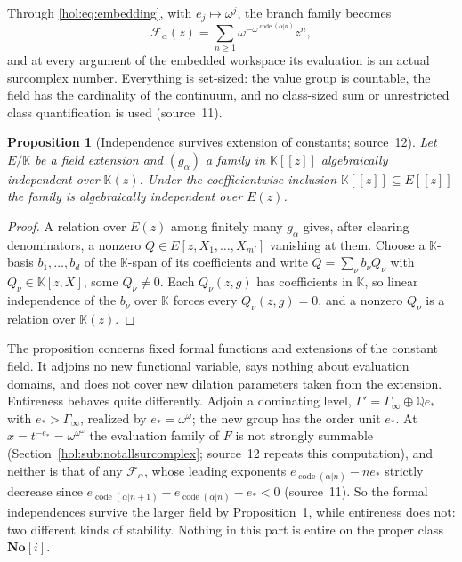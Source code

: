 \documentclass[11pt]{article}
\numberwithin{equation}{section}
\newtheorem{proposition}[theorem]{Proposition}
\theoremstyle{definition}
\theoremstyle{remark}
\newcommand{\Q}{\mathbb Q}
\newcommand{\No}{\mathbf{No}}
\newcommand{\KK}{\mathbb K}
\newcommand{\code}{\operatorname{code}}
\begin{document}
Through \eqref{hol:eq:embedding}, with $e_j\mapsto\omega^j$, the branch family
becomes
\[
 \mathcal F_\alpha(z)=\sum_{n\ge1}\omega^{-\omega^{\code(\alpha|n)}}z^n,
\]
and at every argument of the embedded workspace its evaluation is an actual
surcomplex number. Everything is set-sized: the value group is countable,
the field has the cardinality of the continuum, and no class-sized sum or
unrestricted class quantification is used (source~11).

\begin{proposition}[Independence survives extension of constants;
source~12]\label{hol:cf:prop:scalar}
Let $E/\KK$ be a field extension and $(g_\alpha)$ a family in $\KK[[z]]$
algebraically independent over $\KK(z)$. Under the coefficientwise inclusion
$\KK[[z]]\subseteq E[[z]]$ the family is algebraically independent over $E(z)$.
\end{proposition}

\begin{proof}
A relation over $E(z)$ among finitely many $g_\alpha$ gives, after clearing
denominators, a nonzero $Q\in E[z,X_1,\ldots,X_{m'}]$ vanishing at them. Choose
a $\KK$-basis $b_1,\ldots,b_d$ of the $\KK$-span of its coefficients and write
$Q=\sum_\nu b_\nu Q_\nu$ with $Q_\nu\in\KK[z,X]$, some $Q_\nu\ne0$. Each
$Q_\nu(z,g)$ has coefficients in $\KK$, so linear independence of the
$b_\nu$ over $\KK$ forces every $Q_\nu(z,g)=0$, and a nonzero $Q_\nu$ is a
relation over $\KK(z)$.
\end{proof}

The proposition concerns fixed formal functions and extensions of the
constant field. It adjoins no new functional variable, says nothing about
evaluation domains, and does not cover new dilation parameters taken from the
extension. Entireness behaves quite differently. Adjoin a dominating
level, $\Gamma'=\Gamma_\infty\oplus\Q e_*$ with $e_*>\Gamma_\infty$, realized by
$e_*=\omega^\omega$; the new group has the order unit $e_*$. At
$x=t^{-e_*}=\omega^{\omega^\omega}$ the evaluation family of $F$ is not
strongly summable (Section~\ref{hol:sub:notallsurcomplex}; source~12 repeats
this computation), and neither is that of any $\mathcal F_\alpha$, whose
leading exponents $e_{\code(\alpha|n)}-ne_*$ strictly decrease since
$e_{\code(\alpha|n+1)}-e_{\code(\alpha|n)}-e_*<0$ (source~11). So the formal
independences survive the larger field by
Proposition~\ref{hol:cf:prop:scalar}, while entireness does not: two different
kinds of stability. Nothing in this part is entire on the proper class
$\No[i]$.
\end{document}
